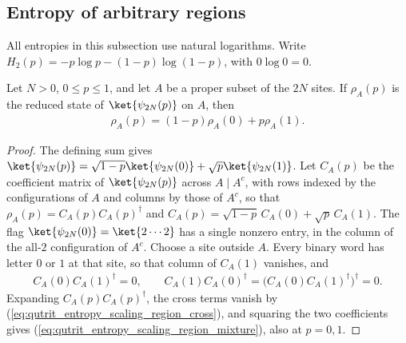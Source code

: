 \subsection{Entropy of arbitrary regions}

All entropies in this subsection use natural logarithms. Write
$H_2(p)=-p\log p-(1-p)\log(1-p)$, with $0\log0=0$.

\begin{lemma}
    \label{thm:qutrit_entropy_scaling_region_mixture}
    \leanok
    Let $N>0$, $0\le p\le1$, and let $A$ be a proper subset of the $2N$ sites.
    If $\rho_A(p)$ is the reduced state of $\ket{\psi_{2N}(p)}$ on $A$, then
    \begin{align}
        \rho_A(p)=(1-p)\rho_A(0)+p\rho_A(1).
        \label{eq:qutrit_entropy_scaling_region_mixture}
    \end{align}
\end{lemma}
\begin{proof}\leanok
    The defining sum gives
    $\ket{\psi_{2N}(p)}=\sqrt{1-p}\ket{\psi_{2N}(0)}
        +\sqrt p\ket{\psi_{2N}(1)}$.
    Let $C_A(p)$ be the coefficient matrix of $\ket{\psi_{2N}(p)}$ across
    $A\mid A^c$, with rows indexed by the configurations of $A$ and columns by
    those of $A^c$, so that $\rho_A(p)=C_A(p)C_A(p)^\dagger$ and
    $C_A(p)=\sqrt{1-p}\,C_A(0)+\sqrt p\,C_A(1)$. The flag
    $\ket{\psi_{2N}(0)}=\ket{2\cdots2}$ has a single nonzero entry, in the
    column of the all-$2$ configuration of $A^c$. Choose a site outside $A$.
    Every binary word has letter $0$ or $1$ at that site, so that column of
    $C_A(1)$ vanishes, and
    \begin{align}
        C_A(0)C_A(1)^\dagger=0,
        \qquad
        C_A(1)C_A(0)^\dagger=\bigl(C_A(0)C_A(1)^\dagger\bigr)^\dagger=0.
        \label{eq:qutrit_entropy_scaling_region_cross}
    \end{align}
    Expanding $C_A(p)C_A(p)^\dagger$, the cross terms vanish by
    (\ref{eq:qutrit_entropy_scaling_region_cross}), and squaring the two
    coefficients gives (\ref{eq:qutrit_entropy_scaling_region_mixture}), also
    at $p=0,1$.
\end{proof}

